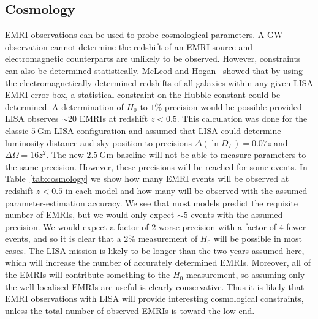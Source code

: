\documentclass[a4paper]{jpconf}
\begin{document}
\subsection{Cosmology}
EMRI observations can be used to probe cosmological parameters. A GW observation cannot determine the redshift of an EMRI source and electromagnetic counterparts are unlikely to be observed. However, constraints can also be determined statistically. McLeod and Hogan~\cite{McLeodHogan} showed that by using the electromagnetically determined redshifts of all galaxies within any given LISA EMRI error box, a statistical constraint on the Hubble constant could be determined. A determination of $H_0$ to $1\%$ precision would be possible provided LISA observes $\sim 20$ EMRIs at redshift $z<0.5$. This calculation was done for the classic $5~\mathrm{Gm}$ LISA configuration and assumed that LISA could determine luminosity distance and sky position to precisions $\Delta(\ln D_{L}) =0.07z$ and $\Delta\Omega = 16 z^2$. The new $2.5~\mathrm{Gm}$ baseline will not be able to measure parameters to the same precision. However, these precisions will be reached for some events. In Table~\ref{tab:cosmology} we show how many EMRI events will be observed at redshift $z < 0.5$ in each model and how many will be observed with the assumed parameter-estimation accuracy. We see that most models predict the requisite number of EMRIs, but we would only expect $\sim 5$ events with the assumed precision. We would expect a factor of $2$ worse precision with a factor of $4$ fewer events, and so it is clear that a $2\%$ measurement of $H_0$ will be possible in most cases. The LISA mission is likely to be longer than the two years assumed here, which will increase the number of accurately determined EMRIs. Moreover, all of the EMRIs will contribute something to the $H_0$ measurement, so assuming only the well localised EMRIs are useful is clearly conservative. Thus it is likely that EMRI observations with LISA will provide interesting cosmological constraints, unless the total number of observed EMRIs is toward the low end.
\end{document}

